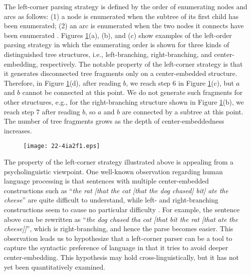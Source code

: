 \documentclass[english]{jnlp_1.4}
\begin{document}
The left-corner parsing strategy is defined by the order of enumerating nodes and arcs as follows: (1) a node is enumerated when the subtree of its first child has been enumerated; (2) an arc is enumerated when the two nodes it connects have been enumerated \cite{abney91memory}.
    Figures \ref{fig:structures}(a), (b), and (c) show
 examples of the left-order parsing strategy in which the enumerating order is shown for three kinds of distinguished tree structures, i.e., left-branching, right-branching, and center-embedding, respectively.
The notable property of the left-corner strategy is that it generates disconnected tree fragments only on a center-embedded structure.
    Therefore, in Figure \ref{fig:structures}(d), after reading $b$, we reach step 6 in Figure \ref{fig:structures}(c), 
but $a$ and $b$ cannot be connected at this point.
    We do not generate such fragments for other structures, e.g., for the right-branching structure shown in Figure \ref{fig:structures}(b), 
we reach step 7 after reading $b$, so $a$ and $b$ are connected by a subtree at this point.
The number of tree fragments grows as the depth of center-embeddedness increases.

\begin{figure}[b]
\begin{center}
\texttt{[image: 22-4ia2f1.eps]}
\end{center}
\label{fig:structures}
\end{figure}

The property of the left-corner strategy illustrated above is appealing from a psycholinguistic viewpoint.
One well-known observation regarding human language processing is that sentences with multiple center-embedded constructions such as ``{\it the rat [that the cat [that the dog chased] bit] ate the cheese}'' are quite difficult to understand, while left- and right-branching constructions seem to cause no particular difficulty \cite{Miller1963-MILFMO,Gibson2000The-dependency-}.
For example, the sentence above can be rewritten as ``{\it the dog chased tha cat [that bit the rat [that ate the cheese]]}'', which is right-branching, and hence the parse becomes easier.
This observation leads us to hypothesize that a left-corner parser can be a tool to capture the syntactic preference of language in that it tries to avoid deeper center-embedding.
This hypothesis may hold cross-linguistically, but it has not yet been quantitatively examined.
\end{document}
